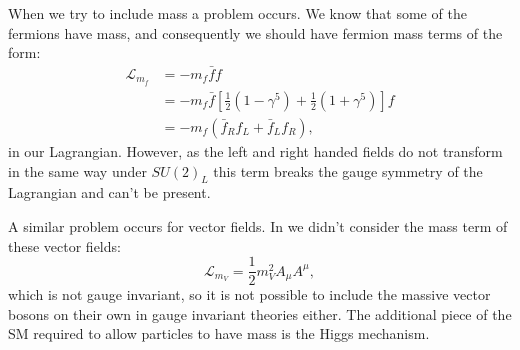 When we try to include mass a problem occurs. We know that some of the fermions have mass, and consequently we should have fermion mass terms of the form:
\begin{equation}
  \begin{split}
    \mathcal{L}_{m_{f}}&=-m_{f}\bar{f}{f} \\
    &=-m_{f}\bar{f}\left[\frac{1}{2}\left(1-\gamma^{5}\right)+\frac{1}{2}\left(1+\gamma^{5}\right)\right]f \\
    &=-m_{f}\left(\bar{f}_{R}f_{L}+\bar{f}_{L}f_{R}\right),
  \end{split}
\end{equation}
in our Lagrangian. However, as the left and right handed fields do not transform in the same way under $SU\left(2\right)_{L}$ this term breaks the gauge symmetry of the Lagrangian and can't be present. 

A similar problem occurs for vector fields. In  we didn't consider the mass term of these vector fields:
\begin{equation}
  \label{eq:vectorlagrangian}
  \mathcal{L}_{m_V}=\frac{1}{2}m_{V}^{2}A_{\mu}A^{\mu},
\end{equation}
which is not gauge invariant, so it is not possible to include the massive vector bosons on their own in gauge invariant theories either. The additional piece of the SM required to allow particles to have mass is the Higgs mechanism.

